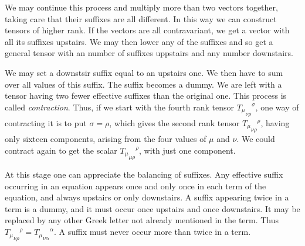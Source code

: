 We may continue this process and multiply more than two vectors together, 
taking care that their suffixes are all different. In this way we can construct 
tensors of higher rank. If the vectors are all contravariant, we get a vector 
with all its suffixes upstairs. We may then lower any of the suffixes and so get 
a general tensor with an number of suffixes uppstairs and any number downstairs.

We may set a downstsir suffix equal to an upstairs one. We then have to sum 
over all values of this suffix. The suffix becomes a dummy. We are left with a 
tensor having two fewer effective suffixes than the original one. This process 
is called \emph{contraction}. Thus, if we start with the fourth rank tensor 
${{T_\mu}_{\nu\rho}}^\sigma$, one way of contracting it is to put $\sigma = 
\rho$, which gives the second rank tensor ${{T_\mu}_{\nu\rho}}^\rho$, having 
only sixteen components, arising from the four values of $\mu$ and $\nu$. We 
could contract again to get the scalar ${{T_\mu}_{\mu\rho}}^\rho$, with just one 
component.

At this stage one can appreciate the balancing of suffixes. Any effective 
suffix occurring in an equation appears once and only once in each term of the 
equation, and always upstairs or only downstairs. A suffix appearing twice in a 
term is a dummy, and it must occur once upstairs and once downstairs. It may be 
replaced by any other Greek letter not already mentioned in the term. Thus 
${{T_\mu}_{\nu\rho}}^\rho = {{T_\mu}_{\nu\alpha}}^\alpha$. A suffix must never 
occur more than twice in a term.
